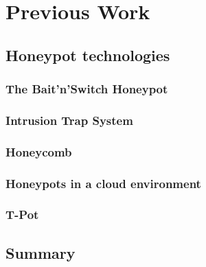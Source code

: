 \chapter{Previous Work}

\section{Honeypot technologies}

\subsection{The Bait'n'Switch Honeypot}

\cite{Diebold2005}

\subsection{Intrusion Trap System}

\cite{Diebold2005}

\subsection{Honeycomb}

\cite{Diebold2005}

\subsection{Honeypots in a cloud environment}

\cite{Kelly2021}

\subsection{T-Pot}

\section{Summary}